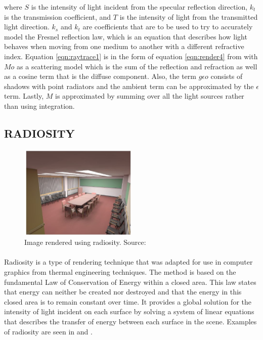 where $S$ is the intensity of light incident from the specular reflection direction, $k_{t}$ is the transmission coefficient, and $T$ is the intensity of light from the transmitted light direction. $k_{s}$ and $k_{t}$ are coefficients that are to be used to try to accurately model the Fresnel reflection law, which is an equation that describes how light behaves when moving from one medium to another with a different refractive index.  Equation \ref{eqn:raytrace1} is in the form of equation \ref{eqn:render4} from \cite{Kajiya1986} with $Mo$ as a scattering model which is the sum of the reflection and refraction as well as a cosine term that is the diffuse component. Also, the term $g\epsilon o$ consists of shadows with point radiators and the ambient term can be approximated by the $\epsilon$ term.  Lastly, $M$ is approximated by summing over all the light sources rather than using integration.

\subsection{RADIOSITY}

\begin{figure}[h!]
  \centering
    \includegraphics[width=0.5\textwidth]{radiositySample.jpg}
  \caption{Image rendered using radiosity. Source: \protect\cite{Keller1997}}
	\label{fig:radiositySample}
\end{figure}

\paragraph{}
Radiosity is a type of rendering technique that was adapted for use in computer graphics from thermal engineering techniques.  The method is based on the fundamental Law of Conservation of Energy within a closed area.  This law states that energy can neither be created nor destroyed and that the energy in this closed area is to remain constant over time.  It provides a global solution for the intensity of light incident on each surface by solving a system of linear equations that describes the transfer of energy between each surface in the scene.  Examples of radiosity are seen in \cite{Immel1986} and \cite{Goral1984}.

